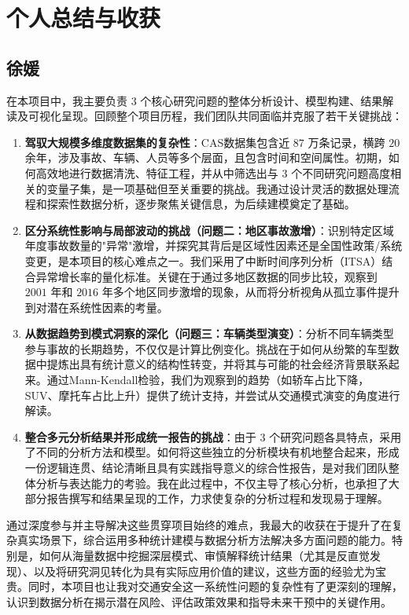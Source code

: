 \documentclass[12pt,a4paper]{article}
\begin{document}
\section{个人总结与收获}
\subsection{徐媛}

在本项目中，我主要负责 $3$ 个核心研究问题的整体分析设计、模型构建、结果解读及可视化呈现。回顾整个项目历程，我们团队共同面临并克服了若干关键挑战：

\begin{enumerate}
\item \textbf{驾驭大规模多维度数据集的复杂性}：CAS数据集包含近 $87$ 万条记录，横跨 $20$ 余年，涉及事故、车辆、人员等多个层面，且包含时间和空间属性。初期，如何高效地进行数据清洗、特征工程，并从中筛选出与 $3$ 个不同研究问题高度相关的变量子集，是一项基础但至关重要的挑战。我通过设计灵活的数据处理流程和探索性数据分析，逐步聚焦关键信息，为后续建模奠定了基础。

\item \textbf{区分系统性影响与局部波动的挑战（问题二：地区事故激增）}：识别特定区域年度事故数量的"异常"激增，并探究其背后是区域性因素还是全国性政策/系统变更，是本项目的核心难点之一。我们采用了中断时间序列分析（ITSA）结合异常增长率的量化标准。关键在于通过多地区数据的同步比较，观察到 $2001$ 年和 $2016$ 年多个地区同步激增的现象，从而将分析视角从孤立事件提升到对潜在系统性因素的考量。

\item \textbf{从数据趋势到模式洞察的深化（问题三：车辆类型演变）}：分析不同车辆类型参与事故的长期趋势，不仅仅是计算比例变化。挑战在于如何从纷繁的车型数据中提炼出具有统计意义的结构性转变，并将其与可能的社会经济背景联系起来。通过Mann-Kendall检验，我们为观察到的趋势（如轿车占比下降，SUV、摩托车占比上升）提供了统计支持，并尝试从交通模式演变的角度进行解读。

\item \textbf{整合多元分析结果并形成统一报告的挑战}：由于 $3$ 个研究问题各具特点，采用了不同的分析方法和模型。如何将这些独立的分析模块有机地整合起来，形成一份逻辑连贯、结论清晰且具有实践指导意义的综合性报告，是对我们团队整体分析与表达能力的考验。我在此过程中，不仅主导了核心分析，也承担了大部分报告撰写和结果呈现的工作，力求使复杂的分析过程和发现易于理解。
\end{enumerate}

通过深度参与并主导解决这些贯穿项目始终的难点，我最大的收获在于提升了在复杂真实场景下，综合运用多种统计建模与数据分析方法解决多方面问题的能力。特别是，如何从海量数据中挖掘深层模式、审慎解释统计结果（尤其是反直觉发现）、以及将研究洞见转化为具有实际应用价值的建议，这些方面的经验尤为宝贵。同时，本项目也让我对交通安全这一系统性问题的复杂性有了更深刻的理解，认识到数据分析在揭示潜在风险、评估政策效果和指导未来干预中的关键作用。
\end{document}
